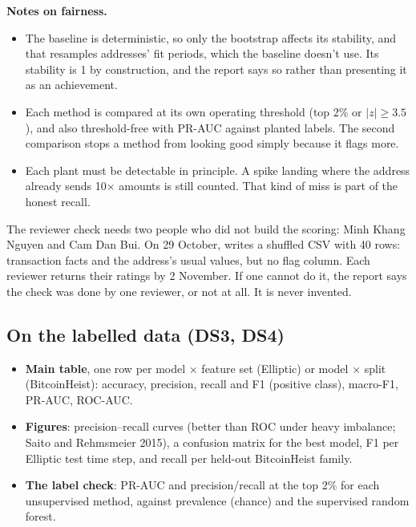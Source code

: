 \textbf{Notes on fairness.}
\begin{itemize}
  \item The baseline is deterministic, so only the bootstrap affects its stability, and that
    resamples addresses' fit periods, which the baseline doesn't use. Its stability is 1 by
    construction, and the report says so rather than presenting it as an achievement.
  \item Each method is compared at its own operating threshold (top 2\% or $|z|\geq3.5$), and also
    threshold-free with PR-AUC against planted labels. The second comparison stops a method from
    looking good simply because it flags more.
  \item Each plant must be detectable in principle. A spike landing where the address already
    sends 10× amounts is still counted. That kind of miss is part of the honest recall.
\end{itemize}

\begin{team}
The reviewer check needs two people who did not build the scoring: Minh Khang Nguyen and Cam
Dan Bui. On 29 October,  writes a shuffled CSV with
40 rows: transaction facts and the address's usual values, but no flag column. Each reviewer
returns their ratings by 2 November. If one cannot do it, the report says the check was done by
one reviewer, or not at all. It is never invented.
\end{team}

\subsection{On the labelled data (DS3, DS4)}

\begin{itemize}
  \item \textbf{Main table}, one row per model × feature set (Elliptic) or model × split
    (BitcoinHeist): accuracy, precision, recall and F1 (positive class), macro-F1, PR-AUC,
    ROC-AUC.
  \item \textbf{Figures}: precision--recall curves (better than ROC under heavy imbalance; Saito and
    Rehmsmeier 2015), a confusion matrix for the best model, F1 per Elliptic test time step, and
    recall per held-out BitcoinHeist family.
  \item \textbf{The label check}: PR-AUC and precision/recall at the top 2\% for each unsupervised
    method, against prevalence (chance) and the supervised random forest.
\end{itemize}

